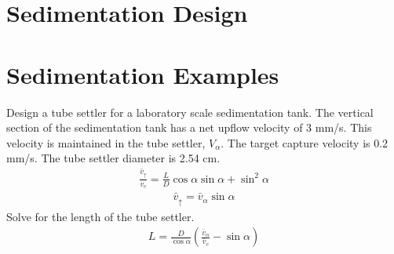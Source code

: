 \documentclass[letterpaper,10pt,english]{sphinxmanual}
\begin{document}
\chapter{Sedimentation Design}
\label{\detokenize{Sedimentation/Sed_Design:sedimentation-design}}\label{\detokenize{Sedimentation/Sed_Design:title-sed-design}}\label{\detokenize{Sedimentation/Sed_Design::doc}}

\chapter{Sedimentation Examples}
\label{\detokenize{Sedimentation/Sed_Examples:sedimentation-examples}}\label{\detokenize{Sedimentation/Sed_Examples:id1}}\label{\detokenize{Sedimentation/Sed_Examples::doc}}
Design a tube settler for a laboratory scale sedimentation tank. The vertical section of the sedimentation tank has a net upflow velocity of 3 mm/s. This velocity is maintained in the tube settler, \(V_\alpha\). The target capture velocity is 0.2 mm/s. The tube settler diameter is 2.54 cm.
\begin{equation}\label{equation:Sedimentation/Sed_Examples:Sedimentation/Sed_Examples:0}
\begin{split}\frac{\bar v_{\uparrow}}{v_c} = \frac{L}{D} \cos \alpha \sin \alpha + \sin ^2 \alpha\end{split}
\end{equation}\begin{equation}\label{equation:Sedimentation/Sed_Examples:Sedimentation/Sed_Examples:1}
\begin{split}\bar v_\uparrow = \bar v_\alpha\sin \alpha\end{split}
\end{equation}
Solve for the length of the tube settler.
\begin{equation}\label{equation:Sedimentation/Sed_Examples:Sedimentation/Sed_Examples:2}
\begin{split}L = \frac{D}{\cos \alpha}\left(\frac{\bar v_\alpha}{\bar v_c} - \sin \alpha\right)\end{split}
\end{equation}
%
\end{document}

